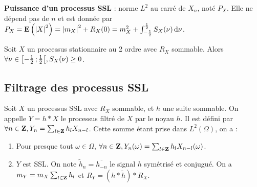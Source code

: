 	\begin{defn}
	\textbf{Puissance d'un processus SSL} : norme $L^2$ au carré de $X_n$, noté $P_X$.
	Elle ne dépend pas de $n$ et est donnée par $P_X = \mathbf{E} \left( \left\lvert X\right\rvert^2 \right) = \left\lvert m_X\right\rvert^2 + R_X(0) = m_X^2 + \int_{-\frac{1}{2}}^{\frac{1}{2}} S_X(\nu) \mathop{}\mathopen{}\mathrm{d} \nu$.
	\end{defn}
	
	\begin{pop}
		Soit $X$ un processus stationnaire au 2 ordre avec $R_X$ sommable.
		Alors $\forall \nu \in \mathopen{}\mathclose{\left[-\frac{1}{2}\mathclose{}\mathpunct{};\frac{1}{2}\right[}, S_X(\nu) \geq 0$.
	\end{pop}

\subsection{Filtrage des processus SSL}

	\begin{pop}
		Soit $X$ un processus SSL avec $R_X$ sommable, et $h$ une suite sommable.
		On appelle $Y = h * X$ le processus filtré de $X$ par le noyau $h$.
		Il est défini par $\forall n \in \mathbf{Z}, Y_n = \sum_{l \in \mathbf{Z}} h_l X_{n - l}$.
		Cette somme étant prise dans $L^2(\Omega)$, on a :
		\begin{enumerate}
		\item
			Pour presque tout $\omega \in \Omega$, $\forall n \in \mathbf{Z}, Y_n(\omega) = \sum_{l \in \mathbf{Z}} h_l X_{n - l}(\omega)$.
		\item
			$Y$ est SSL. On note $\tilde{h}_n = \overline{h_{-n}}$ le signal $h$ symétrisé et conjugué.
			On a $m_Y = m_X \sum_{l \in \mathbf{Z}} h_l$ et $R_Y = (h * \tilde{h}) * R_X$.
		\end{enumerate}
	\end{pop}